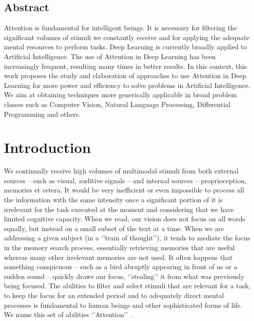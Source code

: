 \documentclass[English]{style/ic-tese-v3}
\begin{document}


\section*{Abstract}
Attention is fundamental for intelligent beings.
It is necessary for filtering the significant volumes of stimuli we constantly receive
and for applying the adequate mental resources to perform tasks.
Deep Learning is currently broadly applied to Artificial Intelligence.
The use of Attention in Deep Learning has been increasingly frequent,
resulting many times in better results.
In this context, this work proposes the study and elaboration of approaches to use Attention in Deep Learning
for more power and efficiency to solve problems in Artificial Intelligence.
We aim at obtaining techniques more generically applicable in broad problem classes
such as Computer Vision, Natural Language Processing, Differential Programming and others.


\chapter{Introduction}
We continually receive high volumes of multimodal stimuli from both external sources
-- such as visual, auditive signals -- and internal sources -- proprioception, memories et cetera.
It would be very inefficient or even impossible to process all the information with
the same intensity once a significant portion of it is irrelevant for
the task executed at the moment and considering that we have limited cognitive capacity.
When we read, our vision does not focus on all
words equally, but instead on a small subset of the text at a time.
When we are addressing a given subject (in a `'train of thought''), it tends to mediate the focus
in the memory search process, essentially retrieving memories that
are useful whereas many other irrelevant memories are not used.
It often happens that something conspicuous
-- such as a bird abruptly appearing in front of us or a sudden sound --
quickly draws our focus, `'stealing'' it from what was previously being focused.
The abilities to filter and select stimuli that are relevant for a task, to keep the focus for an
extended period and to adequately direct mental processes is fundamental to
human beings and other sophisticated forms of life.
We name this set of abilities `'Attention''~\cite{ref:esther-thesis}.
\end{document}
